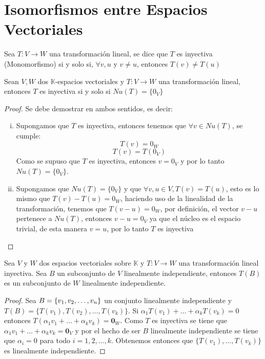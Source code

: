 \section{Isomorfismos entre Espacios Vectoriales}
\begin{dfn}
Sea $T: V \to W$ una transformación lineal, se dice que $T$ es inyectiva (Monomorfismo) si y solo si, $\forall v, u$ y $v \neq u$, entonces $T(v) \neq T(u)$
\end{dfn}
\begin{theorem}
Sean $V,W$ dos $\mathbb{K}$-espacios vectoriales y $T: V \to W$ una transformación lineal, entonces $T$ es inyectiva si y solo si $Nu(T) = \{0_V\}$
\end{theorem}
\begin{proof}
Se debe demostrar en ambos sentidos, es decir:
\begin{enumerate}[i.]
    \item Supongamos que $T$ es inyectiva, entonces tenemos que $\forall v \in Nu(T)$, se cumple:
    $$T(v) = 0_W$$
    $$T(v) = T(0_V)$$
    Como se supuso que $T$ es inyectiva, entonces $v = 0_V$ y por lo tanto $Nu(T) = \{ 0_V\}$.
    \item Supongamos que $Nu(T) = \{ 0_V\}$ y que $\forall v,u \in V, T(v) = T(u)$, esto es lo mismo que $T(v) - T(u) = 0_W$, haciendo uso de la linealidad de la transformación, tenemos que $T(v-u) = 0_W$, por definición, el vector $v-u$ pertenece a $Nu(T)$, entonces $v-u = 0_V$ ya que el núcleo es el espacio trivial, de esta manera $v = u$, por lo tanto $T$ es inyectiva
\end{enumerate}
\end{proof}
\begin{theorem}
Sea $V$ y $W$ dos espacios vectoriales sobre $\mathbb{K}$ y $T : V \to W$ una transformación lineal inyectiva. Sea $B$ un subconjunto de $V$ linealmente independiente, entonces $T(B)$ es un subconjunto de $W$ linealmente independiente. 
\end{theorem}

\begin{proof}
Sea $B =  \lbrace v_1, v_2, \ldots, v_n \rbrace$ un conjunto linealmente independiente y $T(B) = \{T(v_1), T(v_2), \ldots , T(v_k)\}$. Si $\alpha_1 T(v_1) + \ldots + \alpha_k T(v_k) = 0$ entonces $T(\alpha_1 v_1 + \ldots +\alpha_k v_k) = \mathbf{0}_W$. Como $T$ es inyectiva se tiene que $\alpha_1 v_1 + \ldots + \alpha_k v_k = \mathbf{0}_V$ y por el hecho de ser $B$ linealmente independiente se tiene que $\alpha_i = 0$ para todo $i = 1, 2, \ldots , k$. Obtenemos entonces que $\{T(v_1), \ldots , T(v_k)\}$ es linealmente independiente.
\end{proof}

